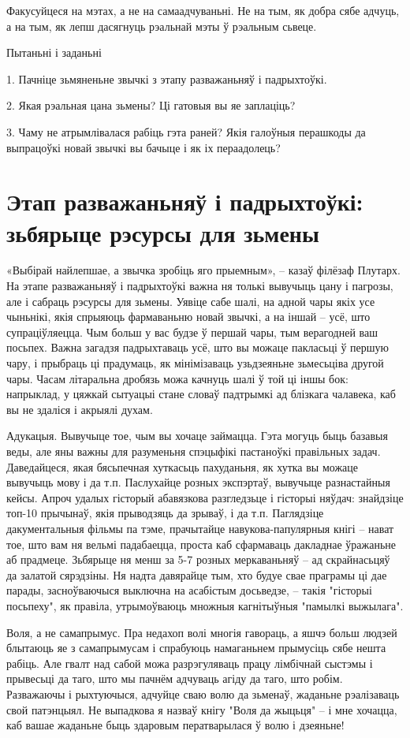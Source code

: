 Факусуйцеся на мэтах, а не на самаадчуваньні. Не на тым, як добра сябе адчуць, а на тым, як лепш дасягнуць рэальнай мэты ў рэальным сьвеце.

Пытаньні і заданьні

1. Пачніце зьмяненьне звычкі з этапу разважаньняў і падрыхтоўкі.

2. Якая рэальная цана зьмены? Ці гатовыя вы яе заплаціць?

3. Чаму не атрымлівалася рабіць гэта раней? Якія галоўныя перашкоды да выпрацоўкі новай звычкі вы бачыце і як іх пераадолець?


\section{Этап разважаньняў і падрыхтоўкі: зьбярыце рэсурсы для зьмены}

«Выбірай найлепшае, а звычка зробіць яго прыемным», – казаў філёзаф Плутарх. На этапе разважаньняў і падрыхтоўкі важна ня толькі вывучыць цану і пагрозы, але і сабраць рэсурсы для зьмены. Уявіце сабе шалі, на адной чары якіх усе чыньнікі, якія спрыяюць фармаваньню новай звычкі, а на іншай – усё, што супраціўляецца. Чым больш у вас будзе ў першай чары, тым верагодней ваш посьпех. Важна загадзя падрыхтаваць усё, што вы можаце пакласьці ў першую чару, і прыбраць ці прадумаць, як мінімізаваць узьдзеяньне зьмесьціва другой чары. Часам літаральна дробязь можа качнуць шалі ў той ці іншы бок: напрыклад, у цяжкай сытуацыі стане словаў падтрымкі ад блізкага чалавека, каб вы не здаліся і акрыялі духам.

Адукацыя. Вывучыце тое, чым вы хочаце займацца. Гэта могуць быць базавыя веды, але яны важны для разуменьня спэцыфікі пастаноўкі правільных задач. Даведайцеся, якая бясьпечная хуткасьць пахуданьня, як хутка вы можаце вывучыць мову і да т.п. Паслухайце розных экспэртаў, вывучыце разнастайныя кейсы. Апроч удалых гісторый абавязкова разгледзьце і гісторыі няўдач: знайдзіце топ-10 прычынаў, якія прыводзяць да зрываў, і да т.п. Паглядзіце дакументальныя фільмы па тэме, прачытайце навукова-папулярныя кнігі – нават тое, што вам ня вельмі падабаецца, проста каб сфармаваць дакладнае ўражаньне аб прадмеце. Зьбярыце ня менш за 5-7 розных меркаваньняў – ад скрайнасьцяў да залатой сярэдзіны. Ня надта давярайце тым, хто будуе свае праграмы ці дае парады, засноўваючыся выключна на асабістым досьведзе, – такія "гісторыі посьпеху", як правіла, утрымоўваюць множныя кагнітыўныя "памылкі выжылага".

Воля, а не самапрымус. Пра недахоп волі многія гавораць, а яшчэ больш людзей блытаюць яе з самапрымусам і спрабуюць намаганьнем прымусіць сябе нешта рабіць. Але гвалт над сабой можа разрэгуляваць працу лімбічнай сыстэмы і прывесьці да таго, што мы пачнём адчуваць агіду да таго, што робім. Разважаючы і рыхтуючыся, адчуйце сваю волю да зьменаў, жаданьне рэалізаваць свой патэнцыял. Не выпадкова я назваў кнігу "Воля да жыцьця" – і мне хочацца, каб вашае жаданьне быць здаровым ператварылася ў волю і дзеяньне!


